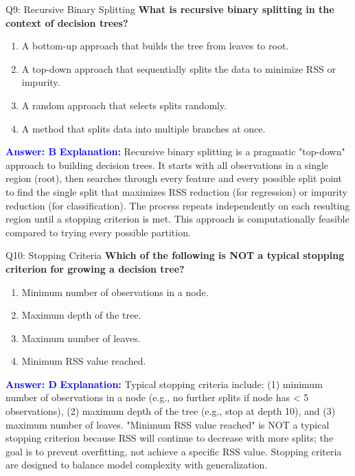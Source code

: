 \documentclass[8pt]{beamer}
\begin{document}
	\begin{frame}{Q9: Recursive Binary Splitting}
		\fontsize{6.5}{7.5}\selectfont
		\textbf{What is recursive binary splitting in the context of decision trees?}
		\begin{enumerate}
			\item A bottom-up approach that builds the tree from leaves to root.
			\item A top-down approach that sequentially splits the data to minimize RSS or impurity.
			\item A random approach that selects splits randomly.
			\item A method that splits data into multiple branches at once.
		\end{enumerate}
		\vspace{0.1cm}
		\textcolor{blue}{\textbf{Answer: B}}
		\vspace{0.1cm}
		\textcolor{blue}{\textbf{Explanation:}} Recursive binary splitting is a pragmatic "top-down" approach to building decision trees. It starts with all observations in a single region (root), then searches through every feature and every possible split point to find the single split that maximizes RSS reduction (for regression) or impurity reduction (for classification). The process repeats independently on each resulting region until a stopping criterion is met. This approach is computationally feasible compared to trying every possible partition.
	\end{frame}
	
	\begin{frame}{Q10: Stopping Criteria}
		\fontsize{6.5}{7.5}\selectfont
		\textbf{Which of the following is NOT a typical stopping criterion for growing a decision tree?}
		\begin{enumerate}
			\item Minimum number of observations in a node.
			\item Maximum depth of the tree.
			\item Maximum number of leaves.
			\item Minimum RSS value reached.
		\end{enumerate}
		\vspace{0.1cm}
		\textcolor{blue}{\textbf{Answer: D}}
		\vspace{0.1cm}
		\textcolor{blue}{\textbf{Explanation:}} Typical stopping criteria include: (1) minimum number of observations in a node (e.g., no further splits if node has < 5 observations), (2) maximum depth of the tree (e.g., stop at depth 10), and (3) maximum number of leaves. "Minimum RSS value reached" is NOT a typical stopping criterion because RSS will continue to decrease with more splits; the goal is to prevent overfitting, not achieve a specific RSS value. Stopping criteria are designed to balance model complexity with generalization.
	\end{frame}
	
\end{document}
